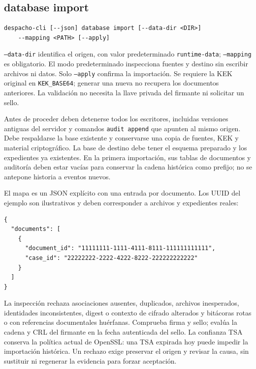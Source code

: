 \subsection{database import}

\begin{lstlisting}[numbers=none]
despacho-cli [--json] database import [--data-dir <DIR>]
    --mapping <PATH> [--apply]
\end{lstlisting}

\texttt{--data-dir} identifica el origen, con valor predeterminado
\texttt{runtime-data}; \texttt{--mapping} es obligatorio. El modo predeterminado
inspecciona fuentes y destino sin escribir archivos ni datos. Solo
\texttt{--apply} confirma la importación. Se requiere la KEK original en
\texttt{KEK\_BASE64}; generar una nueva no recupera los documentos anteriores.
La validación no necesita la llave privada del firmante ni solicitar un sello.

Antes de proceder deben detenerse todos los escritores, incluidas versiones
antiguas del servidor y comandos \texttt{audit append} que apunten al mismo
origen. Debe respaldarse la base existente y conservarse una copia de fuentes,
KEK y material criptográfico. La base de destino debe tener el esquema preparado
y los expedientes ya existentes. En la primera importación, sus tablas de
documentos y auditoría deben estar vacías para conservar la cadena histórica
como prefijo; no se antepone historia a eventos nuevos.

El mapa es un JSON explícito con una entrada por documento. Los UUID del ejemplo
son ilustrativos y deben corresponder a archivos y expedientes reales:

\begin{lstlisting}[numbers=none]
{
  "documents": [
    {
      "document_id": "11111111-1111-4111-8111-111111111111",
      "case_id": "22222222-2222-4222-8222-222222222222"
    }
  ]
}
\end{lstlisting}

La inspección rechaza asociaciones ausentes, duplicados, archivos inesperados,
identidades inconsistentes, digest o contexto de cifrado alterados y bitácoras
rotas o con referencias documentales huérfanas. Comprueba firma y sello; evalúa
la cadena y CRL del firmante en la fecha autenticada del sello. La confianza
TSA conserva la política actual de OpenSSL: una TSA expirada hoy puede impedir
la importación histórica. Un rechazo exige preservar el origen y revisar la
causa, sin sustituir ni regenerar la evidencia para forzar aceptación.

